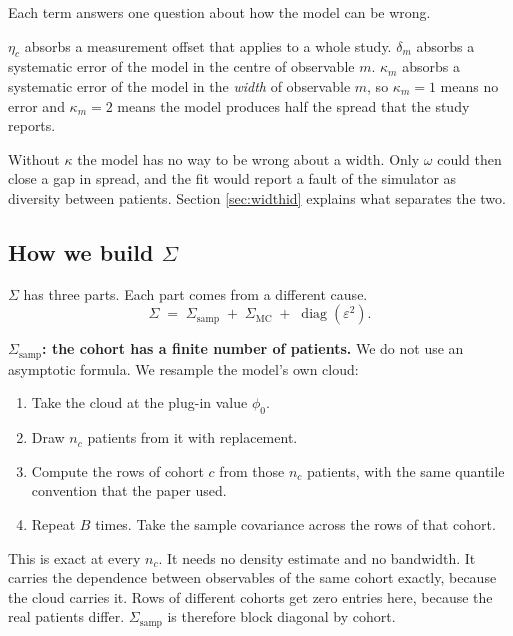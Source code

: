 \documentclass[11pt]{article}
\DeclareMathOperator{\diag}{diag}
\begin{document}
Each term answers one question about how the model can be wrong.

$\eta_c$ absorbs a measurement offset that applies to a whole study. $\delta_m$
absorbs a systematic error of the model in the centre of observable $m$.
$\kappa_m$ absorbs a systematic error of the model in the \emph{width} of
observable $m$, so $\kappa_m=1$ means no error and $\kappa_m=2$ means the model
produces half the spread that the study reports.

Without $\kappa$ the model has no way to be wrong about a width. Only $\omega$
could then close a gap in spread, and the fit would report a fault of the
simulator as diversity between patients. Section \ref{sec:widthid} explains what
separates the two.

\subsection{How we build \texorpdfstring{$\Sigma$}{Sigma}}
\label{sec:sigma}

$\Sigma$ has three parts. Each part comes from a different cause.
\begin{equation}
\Sigma \;=\; \Sigma_{\text{samp}} \;+\; \Sigma_{\text{MC}} \;+\;
\diag(\varepsilon^2).
\label{eq:Sigma}
\end{equation}

\textbf{$\Sigma_{\text{samp}}$: the cohort has a finite number of patients.} We
do not use an asymptotic formula. We resample the model's own cloud:
\begin{enumerate}
\item Take the cloud at the plug-in value $\phi_0$.
\item Draw $n_c$ patients from it with replacement.
\item Compute the rows of cohort $c$ from those $n_c$ patients, with the same
      quantile convention that the paper used.
\item Repeat $B$ times. Take the sample covariance across the rows of that
      cohort.
\end{enumerate}
This is exact at every $n_c$. It needs no density estimate and no bandwidth. It
carries the dependence between observables of the same cohort exactly, because
the cloud carries it. Rows of different cohorts get zero entries here, because
the real patients differ. $\Sigma_{\text{samp}}$ is therefore block diagonal by
cohort.
\end{document}
